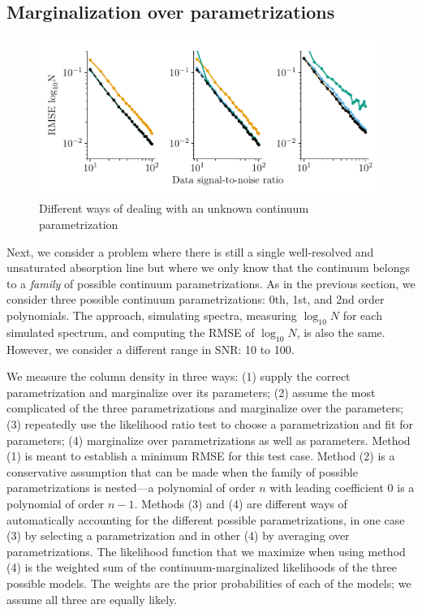 \documentclass[manuscript]{aastex62}
\begin{document}
\subsection{Marginalization over parametrizations}
\label{sec:marginalization-over-parametrizations}
\begin{figure}
  \includegraphics[width=\linewidth]{figures/order_strategies_labeled.pdf}
  \caption{Different ways of dealing with an unknown continuum parametrization}
  \label{fig:order-unknown-comparison}
\end{figure}
Next, we consider a problem where there is still a single well-resolved and unsaturated absorption line but where we only know that the continuum belongs to a \emph{family} of possible continuum parametrizations.
As in the previous section, we consider three possible continuum parametrizations: 0th, 1st, and 2nd order polynomials.
The approach, simulating spectra, measuring $\log_{10}N$ for each simulated spectrum, and computing the RMSE of $\log_{10}N$, is also the same.
However, we consider a different range in SNR: 10 to 100.

We measure the column density in three ways: (1) supply the correct parametrization and marginalize over its parameters; (2) assume the most complicated of the three parametrizations and marginalize over the parameters; (3) repeatedly use the likelihood ratio test to choose a parametrization and fit for parameters; (4) marginalize over parametrizations as well as parameters.
Method (1) is meant to establish a minimum RMSE for this test case.
Method (2) is a conservative assumption that can be made when the family of possible parametrizations is nested---a polynomial of order $n$ with leading coefficient 0 is a polynomial of order $n-1$.
Methods (3) and (4) are different ways of automatically accounting for the different possible parametrizations, in one case (3) by selecting a parametrization and in other (4) by averaging over parametrizations.
The likelihood function that we maximize when using method (4) is the weighted sum of the continuum-marginalized likelihoods of the three possible models.
The weights are the prior probabilities of each of the models; we assume all three are equally likely.
\end{document}
